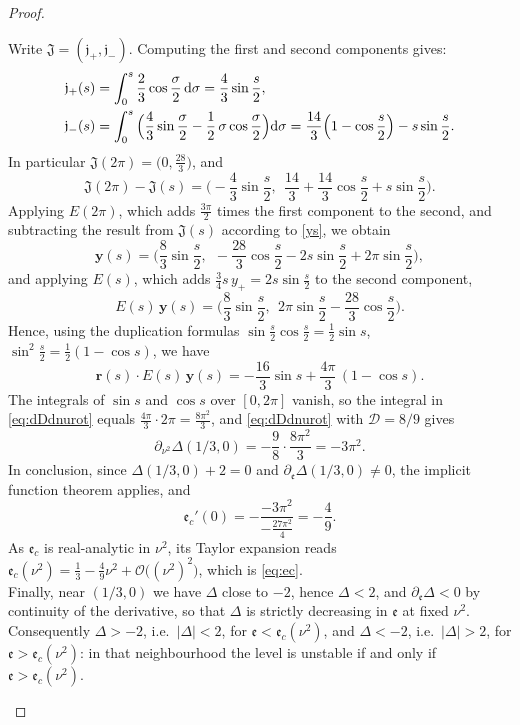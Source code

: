 \documentclass[reqno]{amsart}
\newcommand{\D}{\mathcal{D}}
\newcommand{\ee}{\mathfrak{e}}
\begin{document}
\begin{proof}
\begin{enumerate}
\begin{itemize}
Write $\boldsymbol{\mathfrak{J}}=(\mathfrak{j}_+, \mathfrak{j}_-)$. Computing the first and second components gives:
\[
\begin{aligned}
\mathfrak{j}_+(s)&=\int_0^s\frac{2}{3}\cos\frac{\sigma}{2}\,{\rm d}\sigma=\frac{4}{3}\sin\frac{s}{2},\\
\mathfrak{j}_-(s)
&=\int_0^s\Big( \frac{4}{3}\sin\frac{\sigma}{2}-\frac{1}{2}\,\sigma\cos\frac{\sigma}{2}\Big){\rm d}\sigma=\frac{14}{3}\Big(1-\cos\frac{s}{2}\Big)-s\sin\frac{s}{2} .
\end{aligned}
\]
In particular $\boldsymbol{\mathfrak{J}}(2\pi)=\big(0,\frac{28}{3}\big)$, and
\[
\boldsymbol{\mathfrak{J}}(2\pi)-\boldsymbol{\mathfrak{J}}(s)=\Big(-\frac{4}{3}\sin\frac{s}{2},\ \ \frac{14}{3}+\frac{14}{3}\cos\frac{s}{2}+s\sin\frac{s}{2}\Big).
\]
Applying $E(2\pi)$, which adds $\frac{3\pi}{2}$ times the first component to the second, and subtracting the result from $\boldsymbol{\mathfrak{J}}(s)$ according to \eqref{ys}, we obtain
\[
\mathbf y(s)=\Big(\frac{8}{3}\sin\frac{s}{2},\ \ -\frac{28}{3}\cos\frac{s}{2}-2s\sin\frac{s}{2}+2\pi\sin\frac{s}{2}\Big),
\]
and applying $E(s)$, which adds $\frac{3}{4} s\,y_+=2s\sin\frac{s}{2}$ to the second component,
\[
E(s)\,\mathbf y(s)=\Big(\frac{8}{3}\sin\frac{s}{2},\ \ 2\pi\sin\frac{s}{2}-\frac{28}{3}\cos\frac{s}{2}\Big).
\]
 Hence, using the duplication formulas $\sin\frac{s}{2}\cos\frac{s}{2}=\frac{1}{2}\sin s$, $\sin^2\frac{s}{2}=\frac{1}{2}(1-\cos s)$, we have
\[
\mathbf r(s)\cdot E(s)\,\mathbf y(s)=-\frac{16}{3}\sin s+\frac{4\pi}{3}\,(1-\cos s).
\]
The integrals of $\sin s$ and $\cos s$ over $[0,2\pi]$ vanish, so the integral in \eqref{eq:dDdnurot} equals $\frac{4\pi}{3}\cdot2\pi=\frac{8\pi^2}{3}$, and \eqref{eq:dDdnurot} with $\D=8/9$ gives
\begin{equation}\label{eq:dDdnu2}
\partial_{\nu^2}\Delta(1/3,0)=-\frac98\cdot\frac{8\pi^2}{3}=-3\pi^2 .
\end{equation}
In conclusion, since $\Delta(1/3,0)+2=0$ and $\partial_\ee\Delta(1/3,0)\neq0$, the implicit function theorem applies, and
\begin{equation}
\ee_c'(0)=-\frac{-3\pi^2}{-\frac{27\pi^2}{4}}=-\frac49.
\end{equation}
As $\ee_c$ is real-analytic in $\nu^2$, its Taylor expansion reads $\ee_c(\nu^2)=\frac13-\frac49\nu^2+\mathcal{O}\big((\nu^2)^2\big)$, which is \eqref{eq:ec}.\\
Finally, near $(1/3,0)$ we have $\Delta$ close to $-2$, hence $\Delta<2$, and $\partial_\ee\Delta<0$ by continuity of the derivative, so that $\Delta$ is strictly decreasing in $\ee$ at fixed $\nu^2$. Consequently $\Delta>-2$, i.e.\ $|\Delta|<2$, for $\ee<\ee_c(\nu^2)$, and $\Delta<-2$, i.e.\ $|\Delta|>2$, for $\ee>\ee_c(\nu^2)$: in that neighbourhood the level is unstable if and only if $\ee>\ee_c(\nu^2)$.

\end{itemize}
\end{enumerate}
\end{proof}
\end{document}
